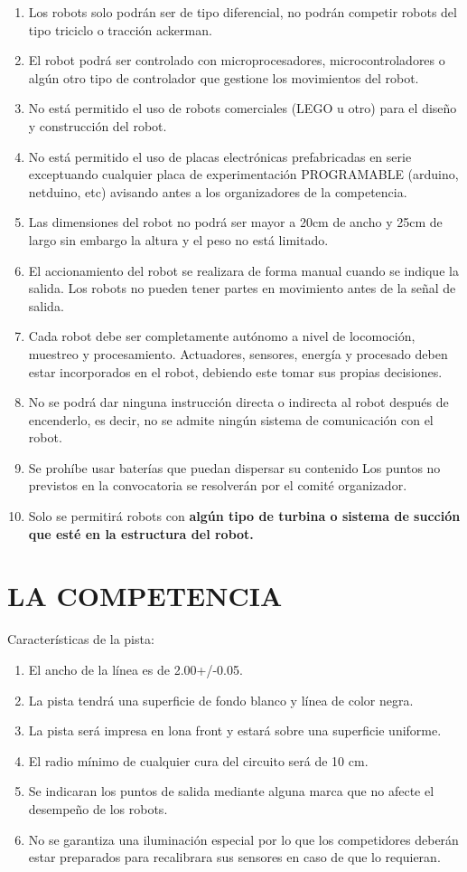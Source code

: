 \documentclass{article}
\begin{document}
\begin{enumerate}
\item Los robots solo podrán ser de tipo diferencial, no podrán competir robots del
tipo triciclo o tracción ackerman.
\item El robot podrá ser controlado con microprocesadores, microcontroladores o
algún otro tipo de controlador que gestione los movimientos del robot.
\item No está permitido el uso de robots comerciales (LEGO u otro) para el diseño y
construcción del robot.
\item No está permitido el uso de placas electrónicas prefabricadas en serie exceptuando
cualquier placa de experimentación PROGRAMABLE (arduino, netduino, etc)
avisando antes a los organizadores de la competencia.
\item Las dimensiones del robot no podrá ser mayor a 20cm de ancho y 25cm de
largo sin embargo la altura y el peso no está limitado.
\item El accionamiento del robot se realizara de forma manual cuando se indique la
salida. Los robots no pueden tener partes en movimiento antes de la señal de
salida.
\item Cada robot debe ser completamente autónomo a nivel de locomoción,
muestreo y procesamiento. Actuadores, sensores, energía y procesado deben
estar incorporados en el robot, debiendo este tomar sus propias decisiones.
\item  No se podrá dar ninguna instrucción directa o indirecta al robot después de
encenderlo, es decir, no se admite ningún sistema de comunicación con el
robot.
\item Se prohíbe usar baterías que puedan dispersar su contenido
Los puntos no previstos en la convocatoria se resolverán por el comité
organizador.
\item Solo se permitirá robots con \textbf{ algún tipo de turbina o sistema de succión que esté en la estructura del robot.}
\end{enumerate}

\section{LA COMPETENCIA}
Características de la pista:
\begin{enumerate}

\item El ancho de la línea es de 2.00+/-0.05.
\item La pista tendrá una superficie de fondo blanco y línea de color negra.
\item La pista será impresa en lona front y estará sobre una superficie uniforme.
\item El radio mínimo de cualquier cura del circuito será de 10 cm.
\item Se indicaran los puntos de salida mediante alguna marca que no afecte el
desempeño de los robots.
\item No se garantiza una iluminación especial por lo que los competidores deberán
estar preparados para recalibrara sus sensores en caso de que lo requieran.
\end{enumerate}
 
\end{document}
